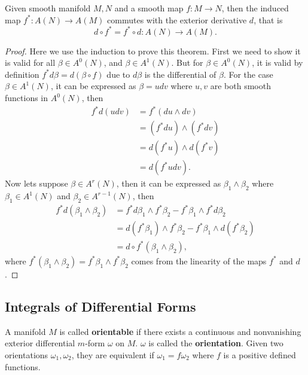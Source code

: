 \begin{theorem}
Given smooth manifold $M,N$ and a smooth map $f:M\to N$, then the induced map $f^*:A(N)\to A(M)$  commutes with the exterior derivative $d$, that is
\begin{equation}
d\circ f^*=f^*\circ d: A(N)\to A(M).
\end{equation}
\end{theorem}

\begin{proof}
Here we use the induction to prove this theorem. First we need to show it is valid for all $\beta\in A^0(N)$, and $\beta\in A^1(N)$. But for $\beta\in A^0(N)$, it is valid by definition $f^*d\beta=d(\beta\circ f)$ due to $d\beta$ is the differential of $\beta$. For the case $\beta\in A^1(N)$, it can be expressed as $\beta=udv$ where $u,v$ are both smooth functions in $A^0(N)$, then
\begin{equation*}
\begin{aligned}
f^*d(udv) &=f^*(du\wedge dv)\\
&=(f^*du)\wedge(f^*dv)\\
&=d(f^*u)\wedge d(f^*v)\\
&=d(f^*udv).
\end{aligned}
\end{equation*}
Now lets suppose $\beta\in A^r(N)$, then it can be expressed as $\beta_1\wedge\beta_2$ where $\beta_1\in A^1(N)$ and $\beta_2\in A^{r-1}(N)$, then
\begin{equation*}
\begin{aligned}
f^*d(\beta_1\wedge\beta_2)&=f^*d\beta_1\wedge f^*\beta_2-f^*\beta_1\wedge f^*d\beta_2\\
&=d(f^*\beta_1)\wedge f^*\beta_2-f^*\beta_1\wedge d(f^*\beta_2)\\
&=d\circ f^*(\beta_1\wedge\beta_2),
\end{aligned}
\end{equation*}
where $f^*(\beta_1\wedge\beta_2)=f^*\beta_1\wedge f^*\beta_2$ comes from the linearity of the maps $f^*$ and $d$.
\end{proof}

\subsection{Integrals of Differential Forms}
\begin{definition}
A manifold $M$ is called \textbf{orientable} if there exists a continuous and nonvanishing exterior differential $m$-form $\omega$ on $M$. $\omega$ is called the \textbf{orientation}. Given two orientations $\omega_1,\omega_2$, they are equivalent if $\omega_1=f\omega_2$ where $f$ is a positive defined functions.
\end{definition}
